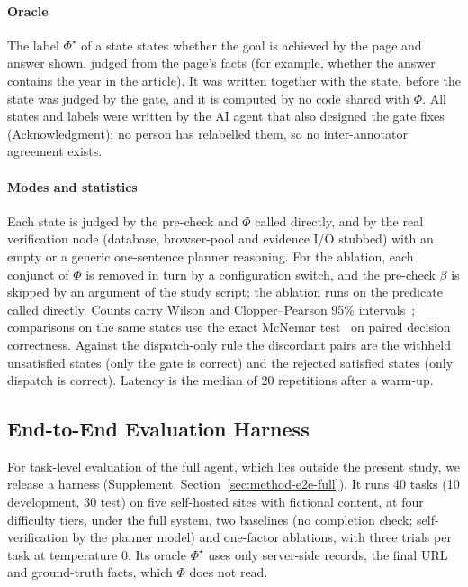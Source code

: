 \paragraph{Oracle} The label $\Phi^{\star}$ of a state states whether the goal is achieved by the page and answer shown, judged from the page's facts (for example, whether the answer contains the year in the article). It was written together with the state, before the state was judged by the gate, and it is computed by no code shared with $\Phi$. All states and labels were written by the AI agent that also designed the gate fixes (Acknowledgment); no person has relabelled them, so no inter-annotator agreement exists.

\paragraph{Modes and statistics} Each state is judged by the pre-check and $\Phi$ called directly, and by the real verification node (database, browser-pool and evidence I/O stubbed) with an empty or a generic one-sentence planner reasoning. For the ablation, each conjunct of $\Phi$ is removed in turn by a configuration switch, and the pre-check $\beta$ is skipped by an argument of the study script; the ablation runs on the predicate called directly. Counts carry Wilson and Clopper--Pearson 95\% intervals~\cite{wilson1927probable,clopper1934use}; comparisons on the same states use the exact McNemar test~\cite{mcnemar1947note} on paired decision correctness. Against the dispatch-only rule the discordant pairs are the withheld unsatisfied states (only the gate is correct) and the rejected satisfied states (only dispatch is correct). Latency is the median of 20 repetitions after a warm-up.

\subsection{End-to-End Evaluation Harness}
\label{sec:method-e2e}

For task-level evaluation of the full agent, which lies outside the present study, we release a harness (Supplement, Section~\ref{sec:method-e2e-full}). It runs 40 tasks (10 development, 30 test) on five self-hosted sites with fictional content, at four difficulty tiers, under the full system, two baselines (no completion check; self-verification by the planner model) and one-factor ablations, with three trials per task at temperature 0. Its oracle $\Phi^{\star}$ uses only server-side records, the final URL and ground-truth facts, which $\Phi$ does not read.

